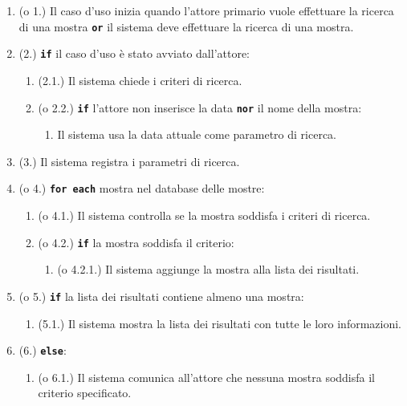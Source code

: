 \documentclass{article}
\begin{document}
		\begin{enumerate}[itemsep=8pt,parsep=0pt]

		\item (o 1.) Il caso d'uso inizia quando l'attore primario vuole effettuare la ricerca di una mostra  \texttt{\textbf{or}} il sistema deve effettuare la ricerca di una mostra.

		\item (2.) \texttt{\textbf{if}} il caso d'uso è stato avviato dall'attore:
			\begin{enumerate}	[leftmargin=28pt]
				\item (2.1.) Il sistema chiede i criteri di ricerca.
				\item (o 2.2.) \texttt{\textbf{if}} l'attore non inserisce la data \texttt{\textbf{nor}} il nome della mostra:
					\begin{enumerate}	[leftmargin=28pt]
						\item Il sistema usa la data attuale come parametro di ricerca.
		  			\end{enumerate}	
  			\end{enumerate}	

		\item (3.) Il sistema registra i parametri di ricerca.

		\item (o 4.) \texttt{\textbf{for each}} mostra nel database delle mostre:
			\begin{enumerate}	[leftmargin=28pt]
				\item (o 4.1.) Il sistema controlla se la mostra soddisfa i criteri di ricerca.
				\item (o 4.2.) \texttt{\textbf{if}} la mostra soddisfa il criterio:
					\begin{enumerate}	[leftmargin=28pt]
						\item (o 4.2.1.) Il sistema aggiunge la mostra alla lista dei risultati.
		  			\end{enumerate}	
  			\end{enumerate}	

		\item (o 5.) \texttt{\textbf{if}} la lista dei risultati contiene almeno una mostra:
			\begin{enumerate}	[leftmargin=28pt]
				\item (5.1.) Il sistema mostra la lista dei risultati con tutte le loro informazioni.
  			\end{enumerate}	

		\item (6.) \texttt{\textbf{else}}:
			\begin{enumerate}	[leftmargin=28pt]
				\item (o 6.1.) Il sistema comunica all'attore che nessuna mostra soddisfa il criterio specificato.
  			\end{enumerate}	
		
\end{enumerate}	
	
\end{document}
